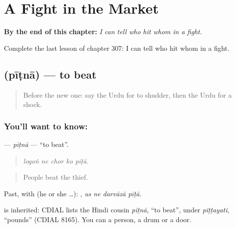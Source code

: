 
\chapter{A Fight in the Market}
\label{ch:ur-a-fight-in-the-market}

\begin{chapteropening}
\textbf{By the end of this chapter:} \emph{I can tell who hit whom in a fight.}

Complete the last lesson of chapter 307: I can tell who hit whom in a fight.
\end{chapteropening}

\section[\texorpdfstring{\ur{پیٹنا} (pīṭnā)}{پیٹنا (pīṭnā)}]{ (pīṭnā) — to beat}

\label{lesson:UR-C307-pitna}



\begin{quote}
Before the new one: say the Urdu for to shudder, then the Urdu for a shock.
\end{quote}

\subsection*{You'll want to know: }
\textbf{} — \emph{pīṭnā} — \textquotedblleft{}to beat\textquotedblright{}.

\begin{quote}
    
\end{quote}

\begin{quote}
\emph{logoṅ ne chor ko pīṭā.}
\end{quote}

\begin{quote}
People beat the thief.
\end{quote}

Past, with  (he or she …):    , \emph{us ne darvāzā pīṭā}.

\begin{cousinweb}
is inherited: CDIAL lists the Hindi cousin \emph{pīṭnā}, \textquotedblleft{}to beat\textquotedblright{}, under \emph{piṭṭayati}, \textquotedblleft{}pounds\textquotedblright{} (CDIAL 8165). You can \textbf{} a person, a drum or a door.
\end{cousinweb}

